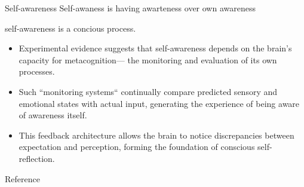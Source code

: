 \begin{frame}[allowframebreaks]{Self-awareness}
    Self-awaness is having awarteness over own awareness
    
    self-awareness is a concious process.
    \begin{itemize}
        \item Experimental evidence suggests that self-awareness depends on the brain's capacity for metacognition— the monitoring and evaluation of its own processes.
        \item Such ``monitoring systems`` continually compare predicted sensory and emotional states with actual input, generating the experience of being aware of awareness itself.
        \item This feedback architecture allows the brain to notice discrepancies between expectation and perception, forming the foundation of conscious self-reflection.
    \end{itemize}
    Reference \cite{garcia-2013-stuck-in-the-moment}
\end{frame}